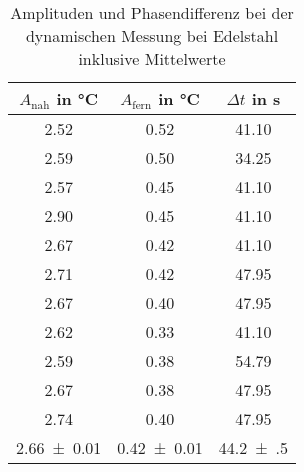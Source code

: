 \begin{table}
\begin{center}
\begin{tabular}{c | c | c}
	$A_\text{nah}$ in \si{\celsius} & $A_\text{fern}$ in \si{\celsius} & $\Delta t$ in \si{\second} \\
\hline
	2.52 & 0.52 & 41.10 \\
	2.59 & 0.50 & 34.25 \\
	2.57 & 0.45 & 41.10 \\
	2.90 & 0.45 & 41.10 \\
	2.67 & 0.42 & 41.10 \\
	2.71 & 0.42 & 47.95 \\
	2.67 & 0.40 & 47.95 \\
	2.62 & 0.33 & 41.10 \\
	2.59 & 0.38 & 54.79 \\
	2.67 & 0.38 & 47.95 \\
	2.74 & 0.40 & 47.95 \\
\hline
	\SI{2.66(1)}{} & \SI{0.42(1)}{} & \SI{44.2(5)}{}
\end{tabular}
\end{center}
\caption{Amplituden und Phasendifferenz bei der dynamischen Messung bei Edelstahl inklusive Mittelwerte}
\label{AmplitudenEdelstahl}
\end{table}